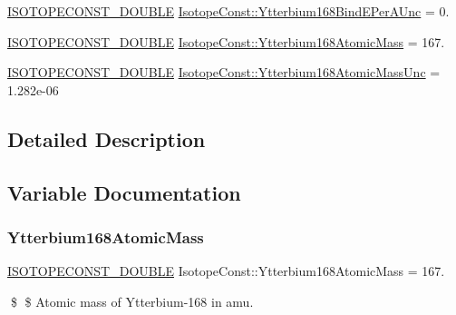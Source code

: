 \begin{DoxyCompactItemize}
\mbox{\hyperlink{group___isotope_const-_macros_ga8f45a7272ce02c0b4c65c44636ed719a}{I\+S\+O\+T\+O\+P\+E\+C\+O\+N\+S\+T\+\_\+\+D\+O\+U\+B\+LE}} \mbox{\hyperlink{group___isotope_const-_ytterbium-_yb168_gad8b78e420dfaf93e6b2454436d19865d}{Isotope\+Const\+::\+Ytterbium168\+Bind\+E\+Per\+A\+Unc}} = 0.
\item 
\mbox{\hyperlink{group___isotope_const-_macros_ga8f45a7272ce02c0b4c65c44636ed719a}{I\+S\+O\+T\+O\+P\+E\+C\+O\+N\+S\+T\+\_\+\+D\+O\+U\+B\+LE}} \mbox{\hyperlink{group___isotope_const-_ytterbium-_yb168_ga5a73184719427cfc0631d8889ea054f5}{Isotope\+Const\+::\+Ytterbium168\+Atomic\+Mass}} = 167.
\item 
\mbox{\hyperlink{group___isotope_const-_macros_ga8f45a7272ce02c0b4c65c44636ed719a}{I\+S\+O\+T\+O\+P\+E\+C\+O\+N\+S\+T\+\_\+\+D\+O\+U\+B\+LE}} \mbox{\hyperlink{group___isotope_const-_ytterbium-_yb168_ga58e53dc6db73b91a8a3c8efc204b8965}{Isotope\+Const\+::\+Ytterbium168\+Atomic\+Mass\+Unc}} = 1.\+282e-\/06
\end{DoxyCompactItemize}


\subsection{Detailed Description}


\subsection{Variable Documentation}
\mbox{\label{group___isotope_const-_ytterbium-_yb168_ga5a73184719427cfc0631d8889ea054f5}} 
\subsubsection{\texorpdfstring{Ytterbium168\+Atomic\+Mass}{Ytterbium168AtomicMass}}
{\footnotesize\ttfamily \mbox{\hyperlink{group___isotope_const-_macros_ga8f45a7272ce02c0b4c65c44636ed719a}{I\+S\+O\+T\+O\+P\+E\+C\+O\+N\+S\+T\+\_\+\+D\+O\+U\+B\+LE}} Isotope\+Const\+::\+Ytterbium168\+Atomic\+Mass = 167.}

\$ \$ Atomic mass of Ytterbium-\/168 in amu. \mbox{\label{group___isotope_const-_ytterbium-_yb168_ga58e53dc6db73b91a8a3c8efc204b8965}} 
